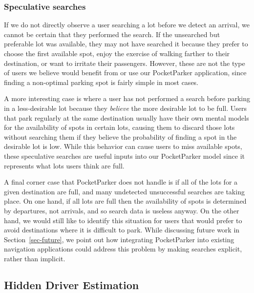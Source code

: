 \subsubsection{Speculative searches}

If we do not directly observe a user searching a lot before we detect an
arrival, we cannot be certain that they performed the search. If the
unsearched but preferable lot was available, they may not have searched it
because they prefer to choose the first available spot, enjoy the exercise of
walking farther to their destination, or want to irritate their passengers.
However, these are not the type of users we believe would benefit from or use
our PocketParker application, since finding a non-optimal parking spot is
fairly simple in most cases.

A more interesting case is where a user has not performed a search before
parking in a less-desirable lot because they \textit{believe} the more
desirable lot to be full. Users that park regularly at the same destination
usually have their own mental models for the availability of spots in certain
lots, causing them to discard those lots without searching them if they
believe the probability of finding a spot in the desirable lot is low. While
this behavior can cause users to miss available spots, these speculative
searches are useful inputs into our PocketParker model since it represents
what lots users think are full.

A final corner case that PocketParker does not handle is if all of the lots
for a given destination are full, and many undetected unsuccessful searches
are taking place. On one hand, if all lots are full then the availability of
spots is determined by departures, not arrivals, and so search data is
useless anyway. On the other hand, we would still like to identify this
situation for users that would prefer to avoid destinations where it is
difficult to park. While discussing future work in Section~\ref{sec-future},
we point out how integrating PocketParker into existing navigation
applications could address this problem by making searches explicit, rather
than implicit.

\subsection{Hidden Driver Estimation}
\label{subsec-hidden}


